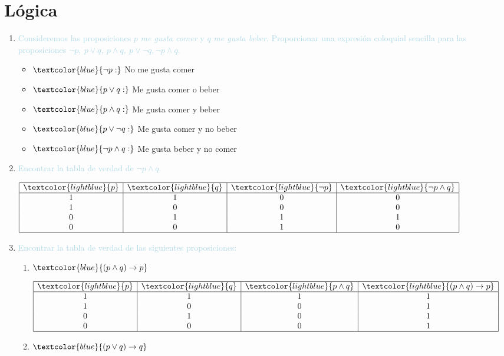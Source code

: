 \documentclass{article}
\newcommand{\lb}[1]{\textcolor{lightblue}{#1}}
\newcommand{\db}[1]{\textcolor{blue}{#1}}
\begin{document}
\section{Lógica}

\begin{enumerate}[label=\color{red}\textbf{\arabic*)}, leftmargin=*]
      \item \lb{Consideremos las proposiciones $p$ \textit{me gusta comer} y $q$ \textit{me gusta beber}. Proporcionar una expresión coloquial sencilla para las proposiciones $\neg p,\: p\vee q, \:p\wedge q, \:p\vee\neg q,\neg p\wedge q$.}
      \begin{itemize}[label=\color{red}$\to$]
            \item $\db{\neg p:}$ No me gusta comer
            \item $\db{p\vee q:}$ Me gusta comer o beber
            \item $\db{p\wedge q:}$ Me gusta comer y beber
            \item $\db{p\vee \neg q:}$ Me gusta comer y no beber
            \item $\db{\neg p\wedge q:}$ Me gusta beber y no comer
      \end{itemize}
      \item \lb{Encontrar la tabla de verdad de $\neg p\wedge q$.}
      
      $\begin{array}{|c|c|c|c|}
            \hline
            \lb{p} & \lb{q} & \lb{\neg p} & \lb{\neg p\wedge q} \\ \hline
            1 & 1 & 0 & 0 \\
            1 & 0 & 0 & 0 \\
            0 & 1 & 1 & 1 \\
            0 & 0 & 1 & 0 \\ \hline 
      \end{array}$
      \item \lb{Encontrar la tabla de verdad de las siguientes proposiciones:}
      \begin{enumerate}[label=\color{red}\alph*)]
            \item $\db{(p\wedge q)\to p}$
            
            $\begin{array}{|c|c|c|c|}
            \hline
            \lb{p} & \lb{q} & \lb{p\wedge q} & \lb{(p\wedge q)\to p} \\  \hline
            1 & 1 & 1 & 1 \\ 
            1 & 0 & 0 & 1 \\ 
            0 & 1 & 0 & 1 \\ 
            0 & 0 & 0 & 1\\ \hline
            \end{array} $
            \item $\db{(p\vee q)\to q}$
            

\end{enumerate}
\end{enumerate}
\end{document}
